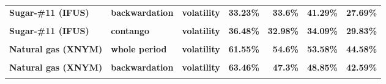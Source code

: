 \documentclass[
  authoryear,
  preprint,
  3p]{elsarticle}
\begin{document}
\begin{longtable}[t]{>{}l>{}l>{}l>{}r>{}r>{}r>{}r}
\textbf{Sugar-\#11 (IFUS)} & \textbf{backwardation} & \textbf{volatility} & \textcolor[HTML]{4285f4}{\textbf{33.23\%}} & \textcolor[HTML]{4285f4}{\textbf{33.6\%}} & \textcolor[HTML]{4285f4}{\textbf{41.29\%}} & \textcolor[HTML]{4285f4}{\textbf{27.69\%}}\\
\textbf{\cellcolor{gray!10}{Sugar-\#11 (IFUS)}} & \textbf{\cellcolor{gray!10}{contango}} & \textbf{\cellcolor{gray!10}{mean}} & \textcolor[HTML]{4285f4}{\textbf{\cellcolor{gray!10}{-20.49\%}}} & \textcolor[HTML]{4285f4}{\textbf{\cellcolor{gray!10}{20.35\%}}} & \textcolor[HTML]{4285f4}{\textbf{\cellcolor{gray!10}{21.47\%}}} & \textcolor[HTML]{4285f4}{\textbf{\cellcolor{gray!10}{4.7\%}}}\\
\textbf{Sugar-\#11 (IFUS)} & \textbf{contango} & \textbf{volatility} & \textcolor[HTML]{4285f4}{\textbf{36.48\%}} & \textcolor[HTML]{4285f4}{\textbf{32.98\%}} & \textcolor[HTML]{4285f4}{\textbf{34.09\%}} & \textcolor[HTML]{4285f4}{\textbf{29.83\%}}\\
\addlinespace
\textbf{\cellcolor{gray!10}{Natural gas (XNYM)}} & \textbf{\cellcolor{gray!10}{whole period}} & \textbf{\cellcolor{gray!10}{mean}} & \textcolor[HTML]{4285f4}{\textbf{\cellcolor{gray!10}{35.38\%}}} & \textcolor[HTML]{4285f4}{\textbf{\cellcolor{gray!10}{16.25\%}}} & \textcolor[HTML]{4285f4}{\textbf{\cellcolor{gray!10}{0.93\%}}} & \textcolor[HTML]{4285f4}{\textbf{\cellcolor{gray!10}{8.33\%}}}\\
\textbf{Natural gas (XNYM)} & \textbf{whole period} & \textbf{volatility} & \textcolor[HTML]{4285f4}{\textbf{61.55\%}} & \textcolor[HTML]{4285f4}{\textbf{54.6\%}} & \textcolor[HTML]{4285f4}{\textbf{53.58\%}} & \textcolor[HTML]{4285f4}{\textbf{44.58\%}}\\
\textbf{\cellcolor{gray!10}{Natural gas (XNYM)}} & \textbf{\cellcolor{gray!10}{backwardation}} & \textbf{\cellcolor{gray!10}{mean}} & \textcolor[HTML]{4285f4}{\textbf{\cellcolor{gray!10}{**85.84\%}}} & \textcolor[HTML]{4285f4}{\textbf{\cellcolor{gray!10}{4.76\%}}} & \textcolor[HTML]{4285f4}{\textbf{\cellcolor{gray!10}{-2.32\%}}} & \textcolor[HTML]{4285f4}{\textbf{\cellcolor{gray!10}{18.33\%}}}\\
\textbf{Natural gas (XNYM)} & \textbf{backwardation} & \textbf{volatility} & \textcolor[HTML]{4285f4}{\textbf{63.46\%}} & \textcolor[HTML]{4285f4}{\textbf{47.3\%}} & \textcolor[HTML]{4285f4}{\textbf{48.85\%}} & \textcolor[HTML]{4285f4}{\textbf{42.59\%}}\\
\textbf{\cellcolor{gray!10}{Natural gas (XNYM)}} & \textbf{\cellcolor{gray!10}{contango}} & \textbf{\cellcolor{gray!10}{mean}} & \textcolor[HTML]{4285f4}{\textbf{\cellcolor{gray!10}{-11.98\%}}} & \textcolor[HTML]{4285f4}{\textbf{\cellcolor{gray!10}{27.84\%}}} & \textcolor[HTML]{4285f4}{\textbf{\cellcolor{gray!10}{4.77\%}}} & \textcolor[HTML]{4285f4}{\textbf{\cellcolor{gray!10}{3.25\%}}}\\

\end{longtable}
\end{document}
